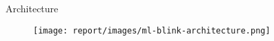 
\begin{frame}{Architecture}
    \begin{figure}
      \texttt{[image: report/images/ml-blink-architecture.png]}
    \end{figure}
\end{frame}